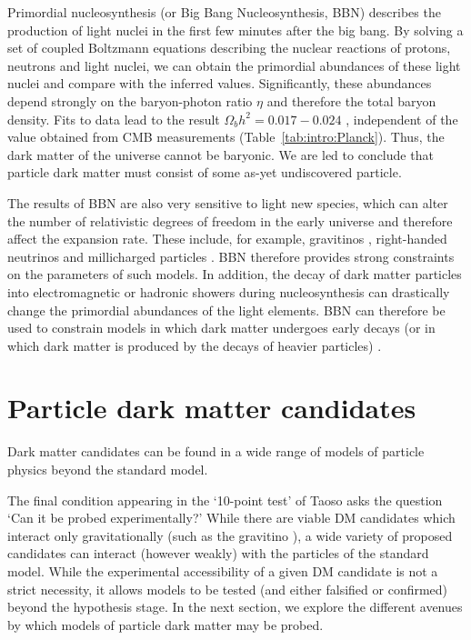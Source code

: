 
Primordial nucleosynthesis (or Big Bang Nucleosynthesis, BBN) describes the production of light nuclei in the first few minutes after the big bang. By solving a set of coupled Boltzmann equations describing the nuclear reactions of protons, neutrons and light nuclei, we can obtain the primordial abundances of these light nuclei and compare with the inferred values.  Significantly, these abundances depend strongly on the baryon-photon ratio $\eta$ and therefore the total baryon density. Fits to data lead to the result $\Omega_b h^2 = 0.017 - 0.024$ \cite{Fields:2006}, independent of the value obtained from CMB measurements (Table~\ref{tab:intro:Planck}). Thus, the dark matter of the universe cannot be baryonic.  We are led to conclude that particle dark matter must consist of some as-yet undiscovered particle. 

The results of BBN are also very sensitive to light new species, which can alter the number of relativistic degrees of freedom in the early universe and therefore affect the expansion rate. These include, for example, gravitinos \cite{Maggiore:2000}, right-handed neutrinos \cite{Cyburt:2005} and millicharged particles \cite{}. BBN therefore provides strong constraints on the parameters of such models.  In addition, the decay of dark matter particles into electromagnetic or hadronic showers during nucleosynthesis can drastically change the primordial abundances of the light elements. BBN can therefore be used to constrain models in which dark matter undergoes early decays (or in which dark matter is produced by the decays of heavier particles) \cite{Jedamzik:2006}.


\section{Particle dark matter candidates}
\label{intro:sec:candidates}


Dark matter candidates can be found in a wide range of models of particle physics beyond the standard model.  


The final condition appearing in the `10-point test' of Taoso \etal asks the question `Can it be probed experimentally?' While there are viable DM candidates which interact only gravitationally (such as the gravitino ), a wide variety of proposed candidates can interact (however weakly) with the particles of the standard model. While the experimental accessibility of a given DM candidate is not a strict necessity, it allows models to be tested (and either falsified or confirmed) beyond the hypothesis stage. In the next section, we explore the different avenues by which models of particle dark matter may be probed.

